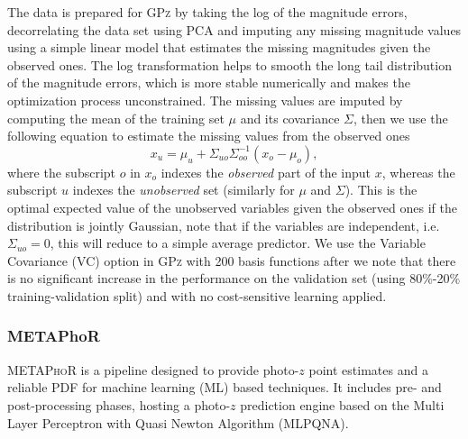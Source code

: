 The data is prepared for \textsc{GPz} by taking the log of the magnitude errors, decorrelating the data set using PCA and imputing any missing magnitude values using a simple linear model that estimates the missing magnitudes given the observed ones.
The log transformation helps to smooth the long tail distribution of the magnitude errors, which is more stable numerically and makes the optimization process unconstrained.
The missing values are imputed by computing the mean of the training set $\mu$ and its covariance $\Sigma$, then we use the following equation to estimate the missing values from the observed ones %
\begin{equation}
x_{u} = \mu_{u}+\Sigma_{uo}\Sigma_{oo}^{-1}(x_{o}-\mu_{o}),
\end{equation}  %
where the subscript $o$ in $x_{o}$ indexes the \emph{observed} part of the input $x$, whereas the subscript $u$ indexes the \emph{unobserved} set (similarly for $\mu$ and $\Sigma$).
This is the optimal expected value of the unobserved variables given the observed ones if the distribution is jointly Gaussian, note that if the variables are independent, i.e. $\Sigma_{uo}=0$, this will reduce to a simple average predictor.
We use the Variable Covariance (VC) option in \textsc{GPz} with 200 basis functions after we note that there is no significant increase in the performance on the validation set (using 80\%-20\% training-validation split) and with no cost-sensitive learning applied.


\subsubsection{METAPhoR}
\label{sec:metaphor}
\textsc{METAPhoR} \citep[Machine-learning Estimation Tool for Accurate Photometric Redshifts,][]{Cavuoti:17} is a pipeline designed to provide photo-$z$ point estimates and a reliable PDF for machine learning (ML) based techniques.
It includes pre- and post-processing phases, hosting a photo-$z$ prediction engine based on the Multi Layer Perceptron with Quasi Newton Algorithm (MLPQNA).

